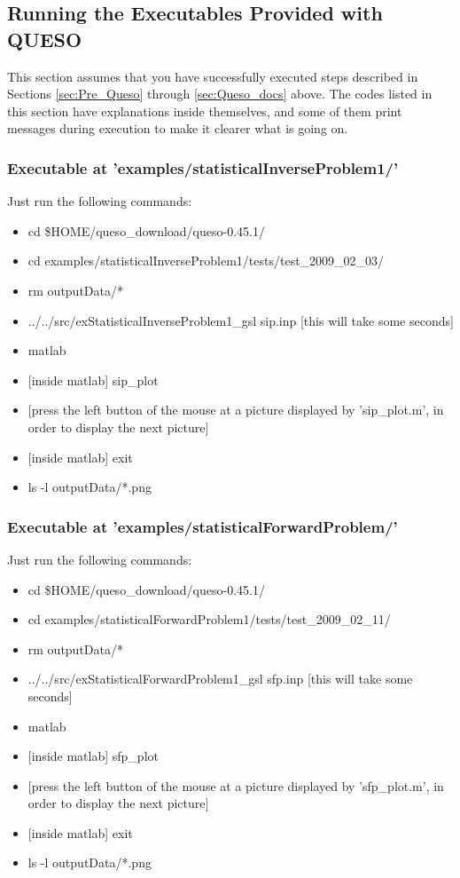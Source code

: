 \subsection{Running the Executables Provided with QUESO} \label{sc-running-execs}

This section assumes that you have successfully executed steps described in Sections \ref{sec:Pre_Queso} through \ref{sec:Queso_docs} above.
The codes listed in this section have explanations inside themselves, and some of them
print messages during execution to make it clearer what is going on.

\subsubsection{Executable at 'examples/statisticalInverseProblem1/'}


Just run the following commands:
\begin{itemize}
\item cd \$HOME/queso\_download/queso-0.45.1/
\item cd examples/statisticalInverseProblem1/tests/test\_2009\_02\_03/
\item rm outputData/*
\item ../../src/exStatisticalInverseProblem1\_gsl sip.inp [this will take some seconds]
\item matlab
\item {[inside matlab]} sip\_plot
\item {[press the left button of the mouse at a picture displayed by 'sip\_plot.m', in order to display the next picture]}
\item {[inside matlab]} exit
\item ls -l outputData/*.png
\end{itemize}

\subsubsection{Executable at 'examples/statisticalForwardProblem/'}

Just run the following commands:
\begin{itemize}
\item cd \$HOME/queso\_download/queso-0.45.1/
\item cd examples/statisticalForwardProblem1/tests/test\_2009\_02\_11/
\item rm outputData/*
\item ../../src/exStatisticalForwardProblem1\_gsl sfp.inp [this will take some seconds]
\item matlab
\item {[inside matlab] sfp\_plot}
\item {[press the left button of the mouse at a picture displayed by 'sfp\_plot.m', in order to display the next picture]}
\item {[inside matlab]} exit
\item ls -l outputData/*.png
\end{itemize}

